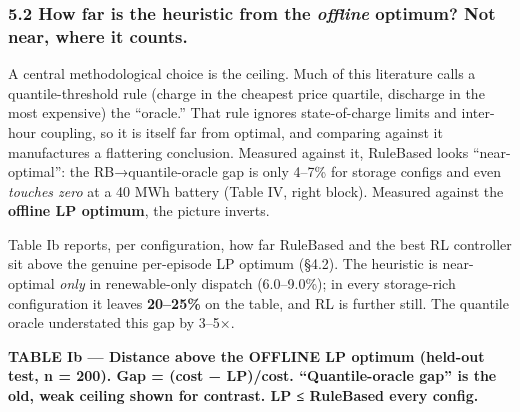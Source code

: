 \documentclass[
  11pt,
]{article}
\begin{document}
\subsubsection{\texorpdfstring{5.2 How far is the heuristic from the
\emph{offline} optimum? Not near, where it
counts.}{5.2 How far is the heuristic from the offline optimum? Not near, where it counts.}}\label{how-far-is-the-heuristic-from-the-offline-optimum-not-near-where-it-counts.}

A central methodological choice is the ceiling. Much of this literature
calls a quantile-threshold rule (charge in the cheapest price quartile,
discharge in the most expensive) the ``oracle.'' That rule ignores
state-of-charge limits and inter-hour coupling, so it is itself far from
optimal, and comparing against it manufactures a flattering conclusion.
Measured against it, RuleBased looks ``near-optimal'': the
RB→quantile-oracle gap is only 4--7\% for storage configs and even
\emph{touches zero} at a 40 MWh battery (Table IV, right block).
Measured against the \textbf{offline LP optimum}, the picture inverts.

Table Ib reports, per configuration, how far RuleBased and the best RL
controller sit above the genuine per-episode LP optimum (§4.2). The
heuristic is near-optimal \emph{only} in renewable-only dispatch
(6.0--9.0\%); in every storage-rich configuration it leaves
\textbf{20--25\%} on the table, and RL is further still. The quantile
oracle understated this gap by 3--5×.

\textbf{TABLE Ib --- Distance above the OFFLINE LP optimum (held-out
test, n = 200). Gap = (cost − LP)/cost. ``Quantile-oracle gap'' is the
old, weak ceiling shown for contrast. LP ≤ RuleBased every config.}
\end{document}
